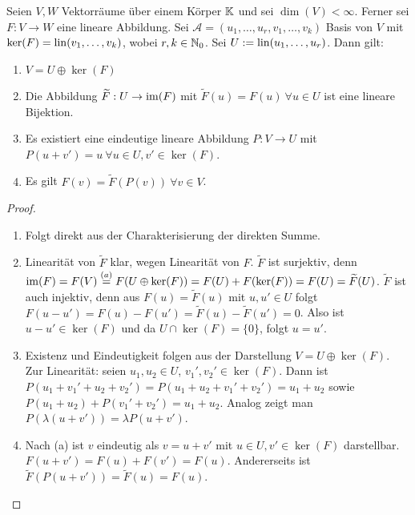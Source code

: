 \begin{thm}
	Seien $ V,W $ Vektorräume über einem Körper $ \mathbb K $ und sei $ \dim(V) < \infty $. Ferner sei $ F : V \to W $ eine lineare Abbildung. Sei $ \mathcal{A} = (u_1, \ldots, u_r,v_1,\ldots,v_k) $ Basis von $ V $ mit $ \ker(F) = \operatorname{lin}(v_1, \ldots, v_k) $, wobei $ r,k \in \mathbb N_0 $. Sei $ U := \operatorname{lin}(u_1, \ldots, u_r) $. Dann gilt:
	\begin{enumerate}[label=\normalfont(\alph*)]
		\item $ V = U \oplus \ker(F) $
		\item Die Abbildung $ \widetilde{F} : U \to \operatorname{im}(F) $ mit $ \widetilde{F}(u) = F(u) \: \forall u \in U $ ist eine lineare Bijektion.
		\item Es existiert eine eindeutige lineare Abbildung $ P : V \to U $ mit $ P(u+v') = u \: \forall u \in U, v' \in \ker(F) $.
		\item Es gilt $ F(v) = \widetilde{F}(P(v)) \: \forall v \in V $.
	\end{enumerate}
\end{thm}
\begin{proof}
	\begin{enumerate}[label=\normalfont(\alph*)]
		\item Folgt direkt aus der Charakterisierung der direkten Summe.
		\item Linearität von $ \widetilde {F} $ klar, wegen Linearität von $ F $. $ \widetilde {F} $ ist surjektiv, denn $ \operatorname{im}(F) = F(V) \stackrel{(a)}{=} F(U \oplus \ker(F)) = F(U) + F(\ker(F)) = F(U) = \widetilde{F}(U) $. $ \widetilde{F} $ ist auch injektiv, denn aus $ F(u) = \widetilde{F}(u) $ mit $ u,u' \in U $ folgt $ F(u-u') = F(u) - F(u') = \widetilde{F}(u) - \widetilde{F}(u') = 0 $. Also ist $ u-u' \in \ker(F) $ und da $ U \cap \ker(F) = \{0\} $, folgt $ u = u' $.
		\item Existenz und Eindeutigkeit folgen aus der Darstellung $ V = U \oplus \ker(F) $. Zur Linearität: seien $ u_1,u_2 \in U $, $ v_1',v_2' \in \ker(F) $. Dann ist $ P(u_1 + v_1' + u_2 + v_2') = P(u_1 + u_2 +v_1' + v_2') = u_1 + u_2 $ sowie $ P(u_1 + u_2) + P(v_1' + v_2') = u_1 + u_2 $. Analog zeigt man $ P(\lambda(u+v')) = \lambda P(u+v') $.
		\item Nach (a) ist $ v $ eindeutig als $ v = u+v' $ mit $ u \in U, v' \in \ker(F) $ darstellbar. $ F(u+v') = F(u) + F(v') = F(u) $. Andererseits ist $ \widetilde{F}(P(u+v')) = \widetilde{F}(u) = F(u) $. \qedhere
	\end{enumerate}
\end{proof}

